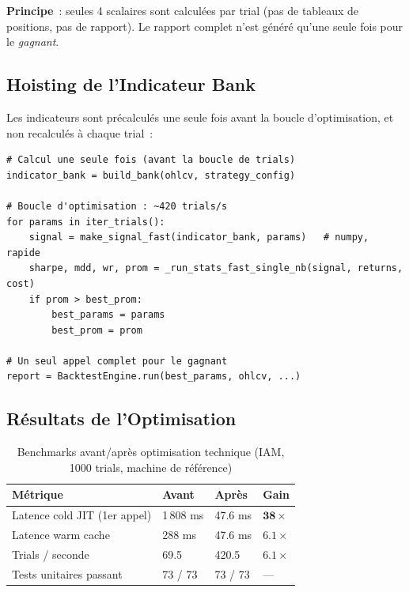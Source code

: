 \textbf{Principe}~: seules 4 scalaires sont calculées par trial (pas de
tableaux de positions, pas de rapport). Le rapport complet n'est généré
qu'une seule fois pour le \emph{gagnant}.

\subsection{Hoisting de l'Indicateur Bank}

Les indicateurs sont précalculés une seule fois avant la boucle d'optimisation,
et non recalculés à chaque trial~:

\begin{lstlisting}[caption={Hoisting de l'indicateur bank avant la boucle de trials},label={lst:hoisting}]
# Calcul une seule fois (avant la boucle de trials)
indicator_bank = build_bank(ohlcv, strategy_config)

# Boucle d'optimisation : ~420 trials/s
for params in iter_trials():
    signal = make_signal_fast(indicator_bank, params)   # numpy, rapide
    sharpe, mdd, wr, prom = _run_stats_fast_single_nb(signal, returns, cost)
    if prom > best_prom:
        best_params = params
        best_prom = prom

# Un seul appel complet pour le gagnant
report = BacktestEngine.run(best_params, ohlcv, ...)
\end{lstlisting}

\subsection{Résultats de l'Optimisation}

\begin{table}[H]
\centering
\caption{Benchmarks avant/après optimisation technique (IAM, 1000 trials, machine de référence)}
\label{tab:benchmarks}
\begin{tabularx}{\linewidth}{@{}lYYY@{}}
\toprule
\textbf{Métrique}      & \textbf{Avant} & \textbf{Après} & \textbf{Gain} \\
\midrule
Latence cold JIT (1er appel) & 1\,808 ms & 47.6 ms  & $\mathbf{38\times}$ \\
Latence warm cache           & 288 ms    & 47.6 ms  & $6.1\times$          \\
Trials / seconde             & 69.5      & 420.5    & $6.1\times$          \\
Tests unitaires passant       & 73 / 73   & 73 / 73  & — \\
\bottomrule
\end{tabularx}
\end{table}

